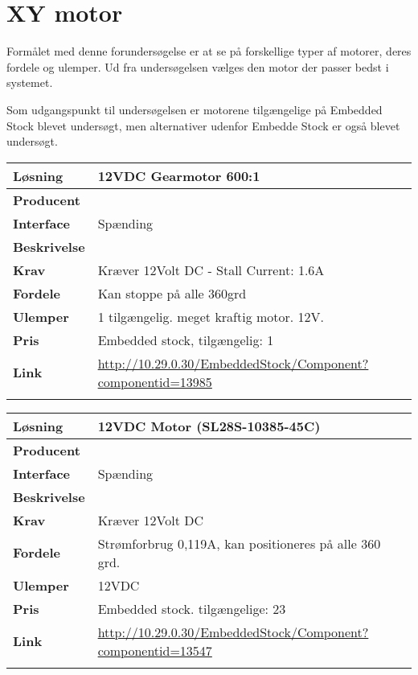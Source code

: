 \section{XY motor}
Formålet med denne forundersøgelse er at se på forskellige typer af motorer, deres fordele og ulemper. Ud fra undersøgelsen vælges den motor der passer bedst i systemet.

Som udgangspunkt til undersøgelsen er motorene tilgængelige på Embedded Stock blevet undersøgt, men alternativer udenfor Embedde Stock er også blevet undersøgt. 

\begin{table}[H] \centering
\begin{tabular}{|p{3cm}|p{11cm}|}
	\hline
	\textbf{Løsning}		
	    & 12VDC Gearmotor 600:1
	\\ \hline
	\textbf{Producent} 		
	    & 
	\\ \hline
	\textbf{Interface} 		
	    & Spænding
	 \\ \hline
	\textbf{Beskrivelse} 	
	    & 
	\\ \hline
	\textbf{Krav} 			
	    & Kræver 12Volt DC - Stall Current: 1.6A
	\\ \hline
	\textbf{Fordele}		
	    & Kan stoppe på alle 360grd
	\\ \hline
	\textbf{Ulemper} 		
	    & 1 tilgængelig. meget kraftig motor. 12V.
	\\ \hline
	\textbf{Pris} 			
	    & Embedded stock, tilgængelig: 1
	\\ \hline
	\textbf{Link} 			
	    & \url{http://10.29.0.30/EmbeddedStock/Component?componentid=13985}
	\\ \hline
	\multicolumn{2}{|c|}{} 
    \\ \hline
\end{tabular}
\end{table}

\begin{table}[H] \centering
\begin{tabular}{|p{3cm}|p{11cm}|}
	\hline
	\textbf{Løsning}		
	    & 12VDC Motor (SL28S-10385-45C)
	\\ \hline
	\textbf{Producent} 		
	    & 
	\\ \hline
	\textbf{Interface} 		
	    & Spænding
	\\ \hline
	\textbf{Beskrivelse} 	
	    & 
	\\ \hline
	\textbf{Krav} 			
	    & Kræver 12Volt DC
	\\ \hline
	\textbf{Fordele}		
	    & Strømforbrug 0,119A, kan positioneres på alle 360 grd.
	\\ \hline
	\textbf{Ulemper} 		
	    & 12VDC
	\\ \hline
	\textbf{Pris} 			
	    & Embedded stock. tilgængelige: 23
	\\ \hline
	\textbf{Link} 			
	    & \url{http://10.29.0.30/EmbeddedStock/Component?componentid=13547} 
	\\ \hline
	\multicolumn{2}{|c|}{} 
    \\ \hline
\end{tabular}
\end{table}

